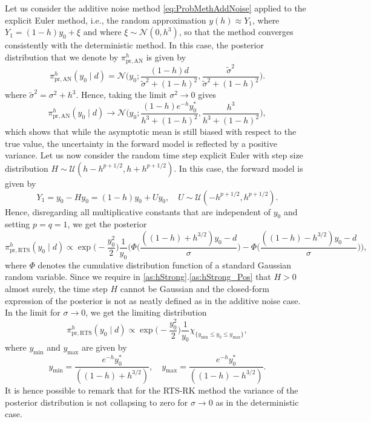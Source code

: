 \documentclass[10pt]{article}
\begin{document}
Let us consider the additive noise method \eqref{eq:ProbMethAddNoise} applied to the explicit Euler method, i.e., the random approximation $y(h) \approx Y_1$, where $Y_1 = (1 - h)y_0 + \xi$ and where $\xi \sim \mathcal N(0, h^3)$, so that the method converges consistently with the deterministic method. In this case, the posterior distribution that we denote by $\pi^h_{\mathrm{pr, AN}}$ is given by
\begin{equation}
\pi^h_{\mathrm{pr, AN}}(y_0 \mid d) = \mathcal N\Big(y_0; \frac{(1 - h)d}{\tilde \sigma^2 + (1- h)^2}, \frac{\tilde \sigma^2}{\tilde \sigma^2 + (1 - h)^2}\Big).
\end{equation}
where $\tilde \sigma^2 = \sigma^2 + h^3$. Hence, taking the limit $\sigma^2 \to 0$ gives
\begin{equation}\label{eq:ExPosteriorAN}
\pi^h_{\mathrm{pr, AN}}(y_0 \mid d) \to \mathcal N\Big(y_0; \frac{(1 - h)e^{-h}y_0^*}{h^3 + (1 - h)^2}, \frac{h^3}{h^3 + (1 - h)^2}\Big),
\end{equation}
which shows that while the asymptotic mean is still biased with respect to the true value, the uncertainty in the forward model is reflected by a positive variance.
Let us now consider the random time step explicit Euler with step size distribution $H \sim \mathcal U(h - h^{p+1/2}, h + h^{p+1/2})$. In this case, the forward model is given by
\begin{equation}
Y_1 = y_0 - H y_0 = (1 - h)y_0 + U y_0, \quad U \sim \mathcal U (-h^{p+1/2}, h^{p+1/2}).
\end{equation}
Hence, disregarding all multiplicative constants that are independent of $y_0$ and setting $p = q = 1$, we get the posterior
\begin{equation}\label{eq:ExPosteriorRTS}
\pi^h_{\mathrm{pr, RTS}}(y_0 \mid d) \propto \exp\Big(-\frac{y_0^2}{2}\Big) \frac{1}{y_0} \Big(\Phi\Big(\frac{((1 - h) + h^{3/2})y_0 - d}{\sigma}\Big) - \Phi\Big(\frac{((1 - h) - h^{3/2})y_0 - d}{\sigma}\Big) \Big),
\end{equation}
where $\Phi$ denotes the cumulative distribution function of a standard Gaussian random variable. Since we require in  \cref{as:hStrong}.\ref{as:hStrong_Pos} that $H > 0$ almost surely, the time step $H$ cannot be Gaussian and the closed-form expression of the posterior is not as neatly defined as in the additive noise case. In the limit for $\sigma \to 0$, we get the limiting distribution 
\begin{equation}
\pi^h_{\mathrm{pr, RTS}}(y_0 \mid d) \propto \exp\Big(-\frac{y_0^2}{2}\Big)\frac{1}{y_0} \chi_{\{y_{\min} \leq y_0 \leq y_{\max}\}},
\end{equation}
where $y_{\min}$ and $y_{\max}$ are given by
\begin{equation}
y_{\min} = \frac{e^{-h}y_0^*}{((1 - h) + h^{3/2})}, \quad y_{\max} = \frac{e^{-h}y_0^*}{((1 - h) - h^{3/2})}.
\end{equation}
It is hence possible to remark that for the RTS-RK method the variance of the posterior distribution is not collapsing to zero for $\sigma \to 0$ as in the deterministic case. 
\end{document}
